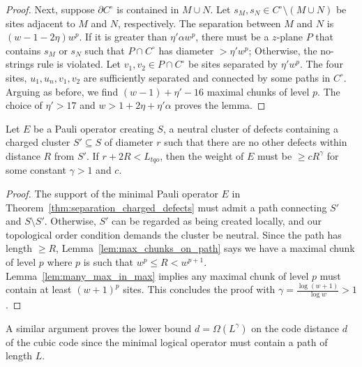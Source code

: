 \begin{proof}
Next, suppose $\partial C^\circ$ is contained in $M \cup N$.
Let $s_M, s_N \in C^\circ \setminus (M\cup N)$ be sites adjacent to $M$ and $N$, respectively.
The separation between $M$ and $N$ is $(w-1-2\eta)w^p$.
If it is greater than $\eta' \alpha w^p$, there must be a $z$-plane $P$ that contains $s_M$ or $s_N$
such that $P \cap C^\circ$ has diameter $> \eta' w^p$; Otherwise, the no-strings rule is violated.
Let $v_1, v_2 \in P \cap C^\circ$ be sites separated by $\eta' w^p$.
The four sites, $u_1,u_n,v_1,v_2$ are sufficiently separated and connected by some paths in $C^\circ$.
Arguing as before, we find $(w -1) + \eta'-16$ maximal chunks of level $p$.
The choice of $\eta' > 17$ and $w > 1+2\eta+\eta'\alpha$ proves the lemma.
\end{proof}


\begin{theorem}
Let $E$ be a Pauli operator creating $S$, a neutral cluster of defects
containing a charged cluster $S' \subseteq S$ of diameter $r$
such that there are no other defects within distance $R$ from $S'$.
If $r+2R < L_{tqo}$, then the weight of $E$ must be $\ge c R^\gamma$ for some constant $\gamma > 1$ and $c$.
\label{thm:separation_charged_defects}
\end{theorem}
\begin{proof}
The support of the minimal Pauli operator $E$ in Theorem~\ref{thm:separation_charged_defects}
must admit a path connecting $S'$ and $S \setminus S'$.
Otherwise, $S'$ can be regarded as being created locally,
and our topological order condition demands the cluster be neutral.
Since the path has length $\ge R$,
Lemma~\ref{lem:max_chunks_on_path} says we have a maximal chunk of level $p$
where $p$ is such that $w^p \le R < w^{p+1}$.
Lemma~\ref{lem:many_max_in_max} implies any maximal chunk of level $p$ must contain
at least $(w+1)^p$ sites.
This concludes the proof with $\gamma=\frac{\log(w+1)}{\log w}>1$.
\end{proof}
A similar argument proves the lower bound $d=\Omega(L^\gamma)$ on the code distance $d$ of the cubic code
since the minimal logical operator must contain a path of length $L$.